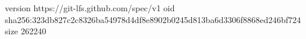 version https://git-lfs.github.com/spec/v1
oid sha256:323db827c2c8326ba54978d4df8e8902b0245d813ba6d3306f8868ed246bf724
size 262240
